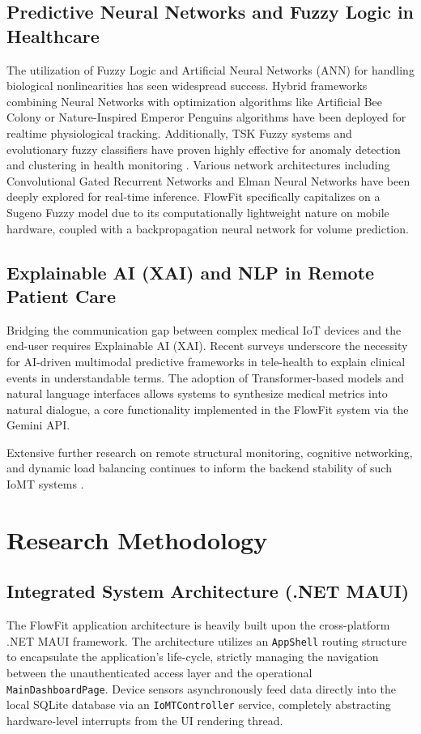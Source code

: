 \documentclass[journal]{IEEEtran}
\begin{document}
\subsection{Predictive Neural Networks and Fuzzy Logic in Healthcare}
The utilization of Fuzzy Logic and Artificial Neural Networks (ANN) for handling biological nonlinearities has seen widespread success. Hybrid frameworks combining Neural Networks with optimization algorithms like Artificial Bee Colony or Nature-Inspired Emperor Penguins algorithms have been deployed for realtime physiological tracking. Additionally, TSK Fuzzy systems and evolutionary fuzzy classifiers have proven highly effective for anomaly detection and clustering in health monitoring \cite{Wu2022_66}. Various network architectures including Convolutional Gated Recurrent Networks and Elman Neural Networks have been deeply explored for real-time inference. FlowFit specifically capitalizes on a Sugeno Fuzzy model \cite{Tang2020_53} due to its computationally lightweight nature on mobile hardware, coupled with a backpropagation neural network for volume prediction.

\subsection{Explainable AI (XAI) and NLP in Remote Patient Care}
Bridging the communication gap between complex medical IoT devices and the end-user requires Explainable AI (XAI). Recent surveys underscore the necessity for AI-driven multimodal predictive frameworks in tele-health to explain clinical events in understandable terms. The adoption of Transformer-based models and natural language interfaces allows systems to synthesize medical metrics into natural dialogue, a core functionality implemented in the FlowFit system via the Gemini API.

Extensive further research on remote structural monitoring, cognitive networking, and dynamic load balancing continues to inform the backend stability of such IoMT systems \cite{Fortunato2025_15}.

\section{Research Methodology}

\subsection{Integrated System Architecture (.NET MAUI)}
The FlowFit application architecture is heavily built upon the cross-platform .NET MAUI framework. The architecture utilizes an \texttt{AppShell} routing structure to encapsulate the application's life-cycle, strictly managing the navigation between the unauthenticated access layer and the operational \texttt{MainDashboardPage}. Device sensors asynchronously feed data directly into the local SQLite database via an \texttt{IoMTController} service, completely abstracting hardware-level interrupts from the UI rendering thread.
\end{document}
